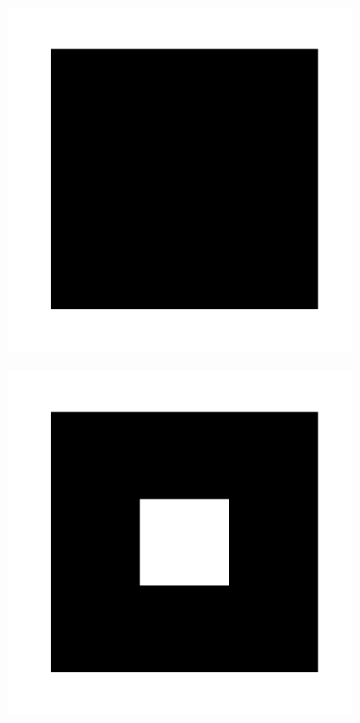 \begin{figure}[h!]
     \centering
    \captionsetup[sub]{font=small}

     \begin{subfigure}[b!]{0.27 \textwidth}
         \caption{}
         \includegraphics[width=\textwidth]{Imagenes/Fractal/sierpinski_carpet_1.pdf}
         \label{}
     \end{subfigure}\hspace*{-0.9em}
     \begin{subfigure}[b!]{0.27 \textwidth}
         \caption{}
         \includegraphics[width=\textwidth]{Imagenes/Fractal/sierpinski_carpet_2.pdf}

\end{subfigure}
\end{figure}
